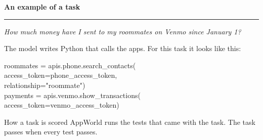 \documentclass[aspectratio=169,11pt]{beamer}
\begin{document}
\begin{frame}
\begin{center}
  {\Large\bfseries\color{deepblue} An example of a task}\\[2pt]
  {\color{accent}\rule{0.36\linewidth}{1.1pt}}
\end{center}

\vspace{0.25em}
\begin{plainbox}
\textit{How much money have I sent to my roommates on Venmo since January 1?}
\end{plainbox}

\vspace{0.35em}
The model writes Python that calls the apps. For this task it looks like this:

\vspace{0.2em}
\begin{codebox}
roommates = apis.phone.search\_contacts(\\
\hspace*{1.5em}access\_token=phone\_access\_token,\\
\hspace*{1.5em}relationship="roommate")\\
payments = apis.venmo.show\_transactions(\\
\hspace*{1.5em}access\_token=venmo\_access\_token)
\end{codebox}

\vspace{0.2em}
\begin{stepbox}{How a task is scored}
AppWorld runs the tests that came with the task. The task passes when every test passes.
\end{stepbox}
\end{frame}
\end{document}
